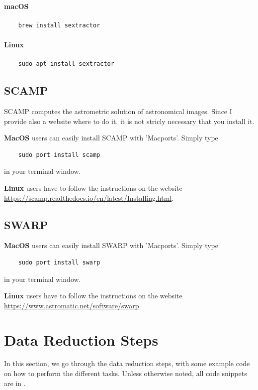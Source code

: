 \documentclass[a4paper, 11pt, fleqn]{memoir}
\begin{document}
\paragraph{macOS}
\begin{verbatim}
    brew install sextractor
\end{verbatim}

\paragraph{Linux}
\begin{verbatim}
    sudo apt install sextractor
\end{verbatim}



\subsection{SCAMP}

SCAMP computes the astrometric solution of astronomical images.
Since I provide also a website where to do it, it is not stricly necessary that you install it.

\textbf{MacOS} users can easily install SCAMP with 'Macports'.
Simply type
\begin{verbatim}
    sudo port install scamp
\end{verbatim}
in your terminal window.

\textbf{Linux} users have to follow the instructions on the website \url{https://scamp.readthedocs.io/en/latest/Installing.html}.


\subsection{SWARP}

\textbf{MacOS} users can easily install SWARP with 'Macports'.
Simply type
\begin{verbatim}
    sudo port install swarp
\end{verbatim}
in your terminal window.

\textbf{Linux} users have to follow the instructions on the website \url{https://www.astromatic.net/software/swarp}.


\section{Data Reduction Steps}
\label{section:data_red_steps}

In this section, we go through the data reduction steps, with some example code on how to perform the different tasks.
Unless otherwise noted, all code snippets are in .
\end{document}
